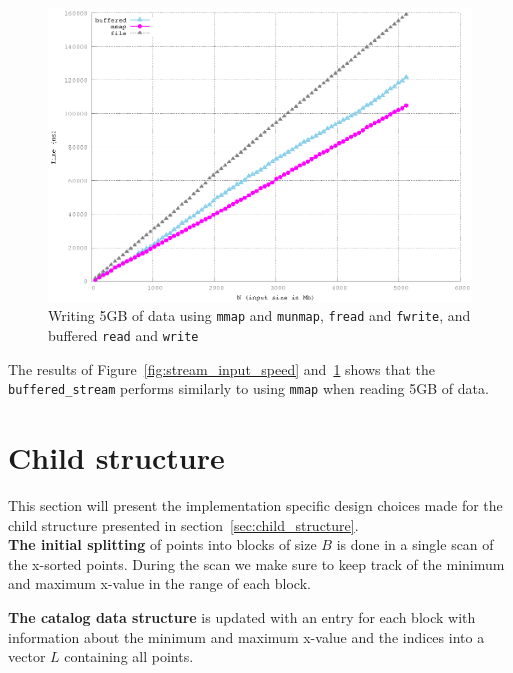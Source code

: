 \documentclass[twoside,11pt,openright]{report}
\begin{document}
\begin{figure}
  \centering
  \includegraphics[width=\linewidth]{../src/experiments/stream_output_speed_experiment_results/2016-04-23.14_54_02/timems}
  \caption{Writing 5GB of data using \texttt{mmap} and \texttt{munmap}, \texttt{fread} and \texttt{fwrite}, and buffered \texttt{read} and \texttt{write}}
  \label{fig:stream_output_speed}
\end{figure}

The results of Figure~\ref{fig:stream_input_speed} and~\ref{fig:stream_output_speed} shows that the \texttt{buffered\_stream} performs similarly to using \texttt{mmap} when reading 5GB of data.



\section{Child structure}
This section will present the implementation specific design choices made for the child structure presented in section~\ref{sec:child_structure}. \\

\textbf{The initial splitting} of points into blocks of size $B$ is done in a single scan of the x-sorted points. During the scan we make sure to keep track of the minimum and maximum x-value in the range of each block.

\textbf{The catalog data structure} is updated with an entry for each block with information about the minimum and maximum x-value and the indices into a vector $L$ containing all points.
\end{document}
